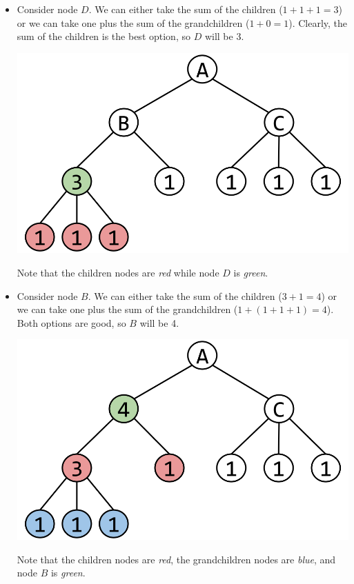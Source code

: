 \documentclass[letterpaper]{article}
\begin{document}
\begin{mdframed}[]
\begin{itemize}
        \item Consider node $D$. We can either take the sum of the children ($1 + 1 + 1 = 3$) or we can take one plus the sum of the grandchildren ($1 + 0 = 1$). Clearly, the sum of the children is the best option, so $D$ will be 3. 
        \begin{center}
            \includegraphics[scale=0.2]{assets/indep_set_ex_2.png}
        \end{center}
        Note that the children nodes are \emph{red} while node $D$ is \emph{green}.

        \item Consider node $B$. We can either take the sum of the children ($3 + 1 = 4$) or we can take one plus the sum of the grandchildren ($1 + (1 + 1 + 1) = 4$). Both options are good, so $B$ will be 4. 
        \begin{center}
            \includegraphics[scale=0.2]{assets/indep_set_ex_3.png}
        \end{center}
        Note that the children nodes are \emph{red}, the grandchildren nodes are \emph{blue}, and node $B$ is \emph{green}.


\end{itemize}
\end{mdframed}
\end{document}
